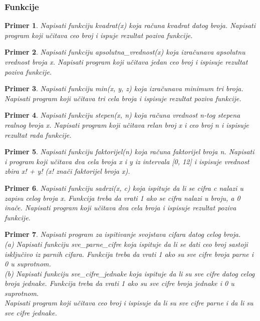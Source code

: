 \documentclass[a4paper]{article}
\newtheorem{primer}{Primer}[section]
\begin{document}
\subsubsection{Funkcije}

\begin{primer}
Napisati funkciju kvadrat(x) koja računa kvadrat
datog broja. Napisati program koji učitava ceo broj i ispuje rezultat poziva
funkcije.
\end{primer}

\begin{primer}
Napisati funkciju apsolutna\_vrednost(x) koja izračunava apsolutnu vrednost broja x. Napisati program koji učitava jedan ceo broj i ispisuje rezultat poziva funkcije.
\end{primer}

\begin{primer}
Napisati funkciju min(x, y, z) koja izračunava minimum tri broja. Napisati program koji učitava tri cela broja i ispisuje rezultat poziva funkcije.
\end{primer}

\begin{primer}
Napisati funkciju stepen(x, n) koja
računa vrednost n-tog stepena realnog broja x. Napisati program koji učitava
relan broj x i ceo broj n i ispisuje rezultat rada funkcije.
\end{primer}

\begin{primer}
Napisati funkciju faktorijel(n) koja računa
faktorijel broja n. Napisati i program koji učitava dva cela broja x i y iz intervala
[0, 12] i ispisuje vrednost zbira x! + y! (x! znači faktorijel broja x).
\end{primer}

\begin{primer}
Napisati funkciju sadrzi(x, c) koja ispituje
da li se cifra c nalazi u zapisu celog broja x. Funkcija treba da vrati 1 ako se cifra
nalazi u broju, a 0 inače. Napisati program koji učitava dva cela broja i ispisuje
rezultat poziva funkcije.
\end{primer}

\begin{primer}
Napisati program za ispitivanje svojstava cifara datog celog
broja.\\
(a) Napisati funkciju sve\_parne\_cifre koja ispituje da li se dati ceo broj sastoji
isključivo iz parnih cifara. Funkcija treba da vrati 1 ako su sve cifre
broja parne i 0 u suprotnom.\\
(b) Napisati funkciju sve\_cifre\_jednake koja ispituje da li su sve cifre datog
celog broja jednake. Funkcija treba da vrati 1 ako su sve cifre broja jednake
i 0 u suprotnom.\\
Napisati program koji učitava ceo broj i ispisuje da li su sve cifre parne i da li su
sve cifre jednake.
\end{primer}
\end{document}

